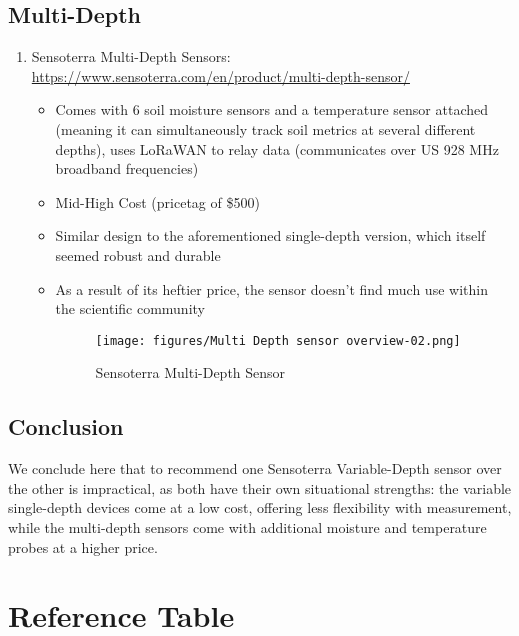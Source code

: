 \documentclass{article}
\begin{document}
\subsection{Multi-Depth}
\begin{enumerate}
\item Sensoterra Multi-Depth Sensors: \url{https://www.sensoterra.com/en/product/multi-depth-sensor/}
\begin{itemize}

    \item Comes with 6 soil moisture sensors and a temperature sensor attached (meaning it can simultaneously track soil metrics at several different depths), uses LoRaWAN to relay data (communicates over US 928 MHz broadband frequencies)
    \item Mid-High Cost (pricetag of \$500)
    \item Similar design to the aforementioned single-depth version, which itself seemed robust and durable
    \item As a result of its heftier price, the sensor doesn't find much use within the scientific community
    
 \begin{figure}[htp]
    \centering
    \texttt{[image: figures/Multi Depth sensor overview-02.png]}
    \caption{Sensoterra Multi-Depth Sensor}
\end{figure}

\end{itemize}
\end{enumerate}

\subsection{Conclusion}
We conclude here that to recommend one Sensoterra Variable-Depth sensor over the other is impractical, as both have their own situational strengths: the variable single-depth devices come at a low cost, offering less flexibility with measurement, while the multi-depth sensors come with additional moisture and temperature probes at a higher price.

\section{Reference Table}
\end{document}
